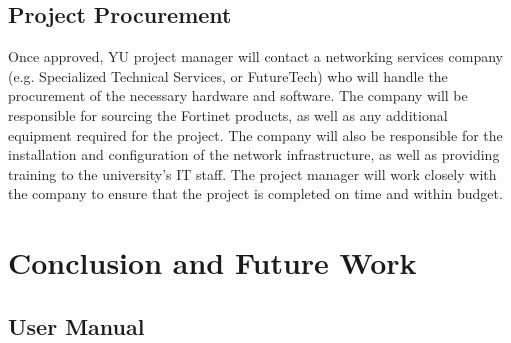\documentclass[12pt]{report}
\begin{document}
\section{Project Procurement}
Once approved, YU project manager will contact a networking services company (e.g. Specialized Technical Services, or FutureTech) who will handle the procurement of the necessary hardware and software. The company will be responsible for sourcing the Fortinet products, as well as any additional equipment required for the project. The company will also be responsible for the installation and configuration of the network infrastructure, as well as providing training to the university's IT staff. The project manager will work closely with the company to ensure that the project is completed on time and within budget.

\chapter{Conclusion and Future Work}
\newpage



\newpage

\begin{appendices}

\chapter{User Manual}
           
\end{appendices}
\end{document}

